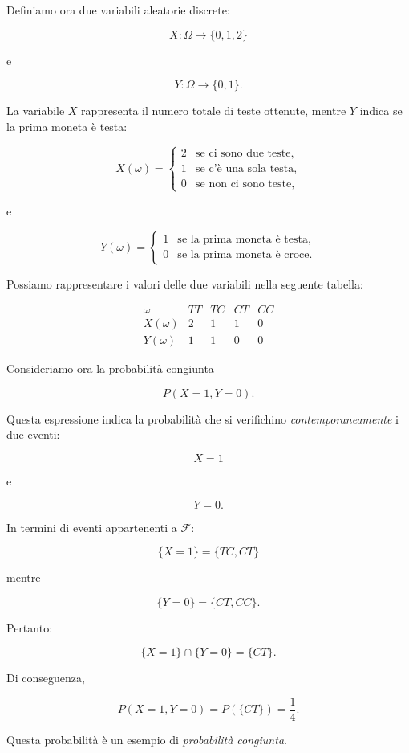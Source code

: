 Definiamo ora due variabili aleatorie discrete:

$$
X:\Omega\to\{0,1,2\}
$$

e

$$
Y:\Omega\to\{0,1\}.
$$

La variabile $X$ rappresenta il numero totale di teste ottenute, mentre $Y$ indica se la prima moneta è testa:

$$
X(\omega)=
\begin{cases}
2 & \text{se ci sono due teste},\\
1 & \text{se c'è una sola testa},\\
0 & \text{se non ci sono teste},
\end{cases}
$$

e

$$
Y(\omega)=
\begin{cases}
1 & \text{se la prima moneta è testa},\\
0 & \text{se la prima moneta è croce}.
\end{cases}
$$

Possiamo rappresentare i valori delle due variabili nella seguente tabella:

$$
\begin{array}{c|cccc}
\omega & TT & TC & CT & CC\\
\hline
X(\omega) & 2 & 1 & 1 & 0\\
Y(\omega) & 1 & 1 & 0 & 0
\end{array}
$$

Consideriamo ora la probabilità congiunta

$$
P(X=1,Y=0).
$$

Questa espressione indica la probabilità che si verifichino
\emph{contemporaneamente} i due eventi:

$$
X=1
$$

e

$$
Y=0.
$$

In termini di eventi appartenenti a $\mathcal F$:

$$
\{X=1\}=\{TC,CT\}
$$

mentre

$$
\{Y=0\}=\{CT,CC\}.
$$

Pertanto:

$$
\{X=1\}\cap\{Y=0\}
=
\{CT\}.
$$

Di conseguenza,

$$
P(X=1,Y=0)
=
P(\{CT\})
=
\frac14.
$$

Questa probabilità è un esempio di \emph{probabilità congiunta}.

